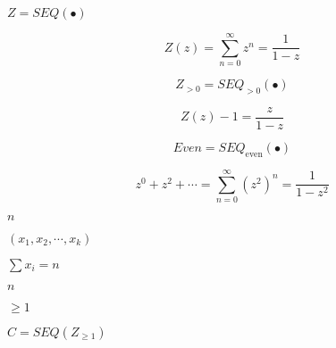 \documentclass[10pt]{book}
\begin{document}
\begin{mdSnippets}
\begin{mdInlineSnippet}[1f11b7ae03fe41651d94de141afcc84a]
$Z=SEQ(\bullet)$\end{mdInlineSnippet}%
\begin{mdDisplaySnippet}%
\[%
Z(z) = \sum_{n=0}^\infty  z^n = \frac{1}{1 - z}
\]%
\end{mdDisplaySnippet}%
\begin{mdDisplaySnippet}%
\[%
  Z_{> 0} = SEQ_{>0}(\bullet)
\]%
\end{mdDisplaySnippet}%
\begin{mdDisplaySnippet}[f08dc0d52577c3c4b4f0637f9089edab]%
\[%
  Z(z) - 1 = \frac{z}{1-z} 
\]%
\end{mdDisplaySnippet}%
\begin{mdDisplaySnippet}[3831680477e199506e6434277f3f5db7]%
\[%
  Even = SEQ_{\text{even}}(\bullet)
\]%
\end{mdDisplaySnippet}%
\begin{mdDisplaySnippet}%
\[%
  z^0+z^2+\cdots = \sum_{n=0}^\infty (z^2)^n = \frac{1}{1-z^2}
\]%
\end{mdDisplaySnippet}%
\begin{mdInlineSnippet}[7b8b965ad4bca0e41ab51de7b31363a1]%
$n$\end{mdInlineSnippet}%
\begin{mdInlineSnippet}%
$(x_1,x_2,\cdots,x_k)$\end{mdInlineSnippet}%
\begin{mdInlineSnippet}[4edcda6935374226723f6450855eb43b]%
$\sum x_i = n$\end{mdInlineSnippet}%
\begin{mdInlineSnippet}[7b8b965ad4bca0e41ab51de7b31363a1]%
$n$\end{mdInlineSnippet}%
\begin{mdInlineSnippet}[190e98cf0a6ba7a8b6ed2eafbfb4e8ea]%
$\geq 1$\end{mdInlineSnippet}%
\begin{mdInlineSnippet}%
$C=SEQ(Z_{\geq1})$\end{mdInlineSnippet}%

\end{mdSnippets}
\end{document}
